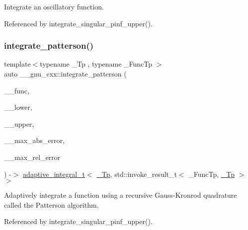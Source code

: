 Integrate an oscillatory function. 

Referenced by integrate\+\_\+singular\+\_\+pinf\+\_\+upper().

\mbox{\label{namespace____gnu__cxx_ae3b63cd8d35caff65b0dda0194373b85}} 
\subsubsection{\texorpdfstring{integrate\+\_\+patterson()}{integrate\_patterson()}}
{\footnotesize\ttfamily template$<$typename \+\_\+\+Tp , typename \+\_\+\+Func\+Tp $>$ \\
auto \+\_\+\+\_\+gnu\+\_\+cxx\+::integrate\+\_\+patterson (\begin{DoxyParamCaption}\item[{\+\_\+\+Func\+Tp}]{\+\_\+\+\_\+func,  }\item[{\hyperlink{namespace____gnu__cxx_a3b19a9c800ca194374ef9172290f7d79}{\+\_\+\+Tp}}]{\+\_\+\+\_\+lower,  }\item[{\hyperlink{namespace____gnu__cxx_a3b19a9c800ca194374ef9172290f7d79}{\+\_\+\+Tp}}]{\+\_\+\+\_\+upper,  }\item[{\hyperlink{namespace____gnu__cxx_a3b19a9c800ca194374ef9172290f7d79}{\+\_\+\+Tp}}]{\+\_\+\+\_\+max\+\_\+abs\+\_\+error,  }\item[{\hyperlink{namespace____gnu__cxx_a3b19a9c800ca194374ef9172290f7d79}{\+\_\+\+Tp}}]{\+\_\+\+\_\+max\+\_\+rel\+\_\+error }\end{DoxyParamCaption}) -\/$>$  \hyperlink{struct____gnu__cxx_1_1adaptive__integral__t}{adaptive\+\_\+integral\+\_\+t}$<$ \hyperlink{namespace____gnu__cxx_a3b19a9c800ca194374ef9172290f7d79}{\+\_\+\+Tp}, std\+::invoke\+\_\+result\+\_\+t$<$ \+\_\+\+Func\+Tp, \hyperlink{namespace____gnu__cxx_a3b19a9c800ca194374ef9172290f7d79}{\+\_\+\+Tp} $>$$>$}

Adaptively integrate a function using a recursive Gauss-\/\+Kronrod quadrature called the Patterson algorithm. 

Referenced by integrate\+\_\+singular\+\_\+pinf\+\_\+upper().

\mbox{\label{namespace____gnu__cxx_a091752f3c6d7a289ec0e0228385468c5}} 
